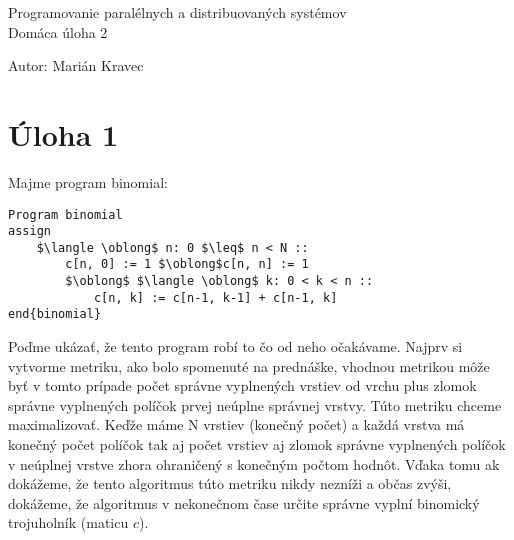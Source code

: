 \documentclass[a4paper]{article}
\begin{document}
 
	
\pagestyle{plain}

\begin{center}
	\sc\large
	Programovanie paralélnych a distribuovaných systémov\\
	Domáca úloha 2
\end{center}

Autor: Marián Kravec

\section{Úloha 1}

Majme program binomial:
\begin{lstlisting}
Program binomial
assign
    $\langle \oblong$ n: 0 $\leq$ n < N ::
        c[n, 0] := 1 $\oblong$c[n, n] := 1
        $\oblong$ $\langle \oblong$ k: 0 < k < n ::
            c[n, k] := c[n-1, k-1] + c[n-1, k]
end{binomial}
\end{lstlisting}

Poďme ukázať, že tento program robí to čo od neho očakávame. Najprv si vytvorme metriku, ako bolo spomenuté na prednáške, vhodnou metrikou môže byť v tomto prípade počet správne vyplnených vrstiev od vrchu plus zlomok správne vyplnených políčok prvej neúplne správnej vrstvy. Túto metriku chceme maximalizovať. Keďže máme N vrstiev (konečný počet) a každá vrstva má konečný počet políčok tak aj počet vrstiev aj zlomok správne vyplnených políčok v neúplnej vrstve zhora ohraničený s konečným počtom hodnôt. Vďaka tomu ak dokážeme, že tento algoritmus túto metriku nikdy nezníži a občas zvýši, dokážeme, že algoritmus v nekonečnom čase určite správne vyplní binomický trojuholník (maticu $c$).
\end{document}
